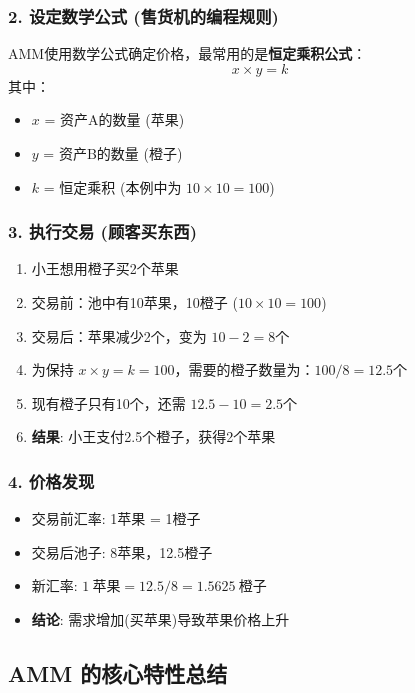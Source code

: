 \documentclass[12pt]{ctexart}
\begin{document}
\subsubsection{2. 设定数学公式 (售货机的编程规则)}
AMM使用数学公式确定价格，最常用的是\textbf{恒定乘积公式}：
\[
x \times y = k
\]
其中：
\begin{itemize}
    \item $x$ = 资产A的数量 (苹果)
    \item $y$ = 资产B的数量 (橙子)
    \item $k$ = 恒定乘积 (本例中为 $10 \times 10 = 100$)
\end{itemize}

\subsubsection{3. 执行交易 (顾客买东西)}
\begin{enumerate}
    \item 小王想用橙子买2个苹果
    \item 交易前：池中有10苹果，10橙子 ($10 \times 10 = 100$)
    \item 交易后：苹果减少2个，变为 $10 - 2 = 8$个
    \item 为保持 $x \times y = k = 100$，需要的橙子数量为：$100 / 8 = 12.5$个
    \item 现有橙子只有10个，还需 $12.5 - 10 = 2.5$个
    \item \textbf{结果}: 小王支付2.5个橙子，获得2个苹果
\end{enumerate}

\subsubsection{4. 价格发现}
\begin{itemize}
    \item 交易前汇率: 1苹果 = 1橙子
    \item 交易后池子: 8苹果，12.5橙子
    \item 新汇率: $1\ \text{苹果} = 12.5 / 8 = 1.5625\ \text{橙子}$
    \item \textbf{结论}: 需求增加(买苹果)导致苹果价格上升
\end{itemize}

\subsection{AMM 的核心特性总结}
\end{document}
